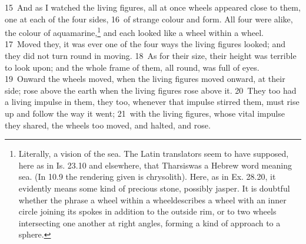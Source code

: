 \documentclass[10pt]{book} %
\begin{document}
\textcolor{benred8}{15}~And as I watched the living figures, all at once wheels appeared close to them, one at each of the four sides, \textcolor{benred8}{16}~of strange colour and form. All four were alike, the colour of aquamarine,\footnote[4]{Literally, \textasciigrave a vision of the sea\textquotesingle . The Latin translators seem to have supposed, here as in Is. 23.10 and elsewhere, that \textasciigrave Tharsis\textquotesingle  was a Hebrew word meaning \textasciigrave sea\textquotesingle . (In 10.9 the rendering given is \textasciigrave chrysolith\textquotesingle ). Here, as in Ex. 28.20, it evidently means some kind of precious stone, possibly jasper. It is doubtful whether the phrase \textasciigrave a wheel within a wheel\textquotesingle  describes a wheel with an inner circle joining its spokes in addition to the outside rim, or to two wheels intersecting one another at right angles, forming a kind of approach to a sphere.} and each looked like a wheel within a wheel. \textcolor{benred8}{17}~Moved they, it was ever one of the four ways the living figures looked; and they did not turn round in moving. \textcolor{benred8}{18}~As for their size, their height was terrible to look upon; and the whole frame of them, all round, was full of eyes. \textcolor{benred8}{19}~Onward the wheels moved, when the living figures moved onward, at their side; rose above the earth when the living figures rose above it. \textcolor{benred8}{20}~They too had a living impulse in them, they too, whenever that impulse stirred them, must rise up and follow the way it went; \textcolor{benred8}{21}~with the living figures, whose vital impulse they shared, the wheels too moved, and halted, and rose.
\end{document}
